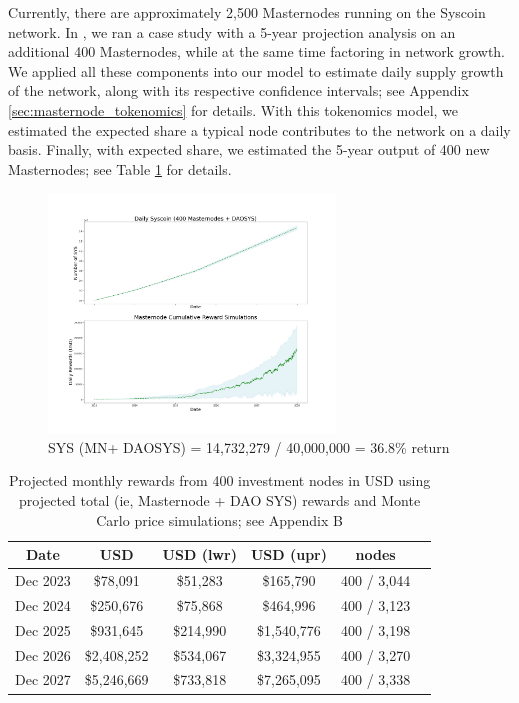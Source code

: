 \documentclass[journal,twocolumn,12pt]{ieeesyscoin}
\begin{document}
Currently, there are approximately 2,500 Masternodes running on the Syscoin network. In \cite{Moo22}, we ran a case study with a 5-year projection analysis on an additional 400 Masternodes, while at the same time factoring in network growth. We applied all these components into our model to estimate daily supply growth of the network, along with its respective confidence intervals; see Appendix \ref{sec:masternode_tokenomics} for details. With this tokenomics model, we estimated the expected share a typical node contributes to the network on a daily basis. Finally, with expected share, we estimated the 5-year output of 400 new Masternodes; see Table \ref{table:mn_returns} for details.

\begin{figure}[h!]
\includegraphics[width=3in]{img/supply_tot_reward_output.png}
\caption{SYS (MN+ DAOSYS)  = 14,732,279 / 40,000,000 = 36.8\% return} 
\label{fig:reward_output}
\end{figure} 

\begin{table}[h]
\centering
\begin{tabular}{ |c|c|c|c|c|c| } 
\hline
 \textbf{Date} & \textbf{USD} & \textbf{USD (lwr)} & \textbf{USD (upr)} & \textbf{nodes} \\
\hline
Dec 2023 & \$78,091 & \$51,283 & \$165,790 & 400 / 3,044\\
Dec 2024 & \$250,676 & \$75,868 & \$464,996  & 400 / 3,123 \\
Dec 2025 & \$931,645 & \$214,990 & \$1,540,776 & 400 / 3,198 \\
Dec 2026 & \$2,408,252 & \$534,067 & \$3,324,955 & 400 / 3,270 \\
Dec 2027 & \$5,246,669 & \$733,818 & \$7,265,095 & 400 / 3,338 \\
\hline
\end{tabular}
\caption{Projected monthly rewards from 400 investment nodes in USD using projected total (ie, Masternode + DAO SYS) rewards and Monte Carlo price simulations; see Appendix B}
\label{table:mn_returns}
\end{table}
\end{document}

